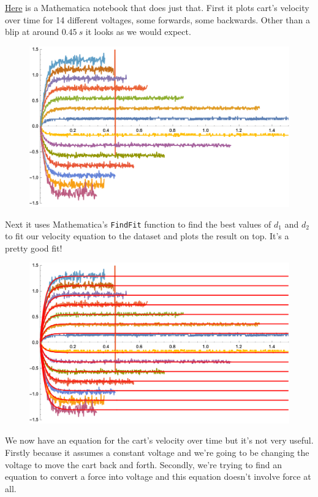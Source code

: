 \documentclass{article}
\begin{document}
\href{https://github.com/chrisdoble/self-balancing-inverted-pendulum/blob/master/notebooks/motor.nb}{Here} is a Mathematica notebook that does just that. First it plots cart's velocity over time for 14 different voltages, some forwards, some backwards. Other than a blip at around $\qty{0.45}{s}$ it looks as we would expect.

\begin{figure}[H]
  \centering
\includegraphics[width=\textwidth]{velocities}
\end{figure}

Next it uses Mathematica's \texttt{FindFit} function to find the best values of $d_1$ and $d_2$ to fit our velocity equation to the dataset and plots the result on top. It's a pretty good fit!

\begin{figure}[H]
  \centering
\includegraphics[width=\textwidth]{velocities_fitted_1}
\end{figure}

We now have an equation for the cart's velocity over time but it's not very useful. Firstly because it assumes a constant voltage and we're going to be changing the voltage to move the cart back and forth. Secondly, we're trying to find an equation to convert a force into voltage and this equation doesn't involve force at all.
\end{document}
